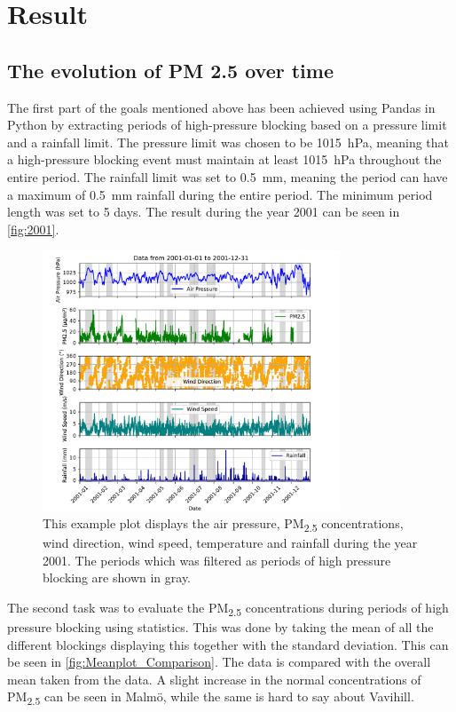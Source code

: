 \section{Result}

\subsection{The evolution of PM 2.5 over time}
The first part of the goals mentioned above has been achieved using Pandas in Python by extracting periods of high-pressure blocking based on a pressure limit and a rainfall limit. The pressure limit was chosen to be \SI{1015}{\hecto\pascal}, meaning that a high-pressure blocking event must maintain at least \SI{1015}{\hecto\pascal} throughout the entire period. The rainfall limit was set to \SI{0.5}{\milli\meter}, meaning the period can have a maximum of \SI{0.5}{\milli\meter} rainfall during the entire period. The minimum period length was set to 5 days. The result during the year 2001 can be seen in \autoref{fig:2001}.

\begin{figure}[H]
    \centering    \includegraphics[width=0.79\textwidth]{Figures/plot_20010101_20011231.pdf}
    \caption{This example plot displays the air pressure, PM\textsubscript{2.5} concentrations, wind direction, wind speed, temperature and rainfall during the year 2001. The periods which was filtered as periods of high pressure blocking are shown in gray. }
    \label{fig:2001}
\end{figure}

The second task was to evaluate the PM\textsubscript{2.5} concentrations during periods of high pressure blocking using statistics. This was done by taking the mean of all the different blockings displaying this together with the standard deviation. This can be seen in \autoref{fig:Meanplot_Comparison}. The data is compared with the overall mean taken from the data. A slight increase in the normal concentrations of PM\textsubscript{2.5} can be seen in Malmö, while the same is hard to say about Vavihill. 





